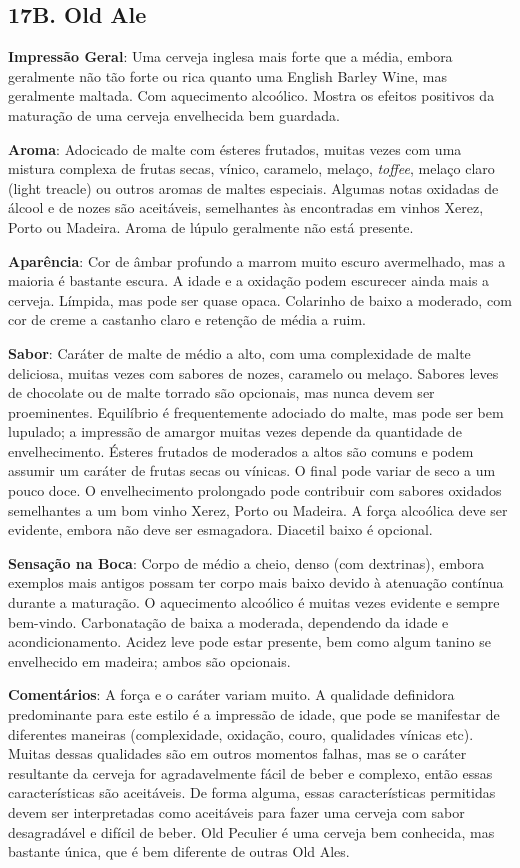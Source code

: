 \subsection*{17B. Old Ale}
\textbf{Impressão Geral}: Uma cerveja inglesa mais forte que a média, embora geralmente não tão forte ou rica quanto uma English Barley Wine, mas geralmente maltada. Com aquecimento alcoólico. Mostra os efeitos positivos da maturação de uma cerveja envelhecida bem guardada.

\textbf{Aroma}: Adocicado de malte com ésteres frutados, muitas vezes com uma mistura complexa de frutas secas, vínico, caramelo, melaço, \textit{toffee}, melaço claro (light treacle) ou outros aromas de maltes especiais. Algumas notas oxidadas de álcool e de nozes são aceitáveis, semelhantes às encontradas em vinhos Xerez, Porto ou Madeira. Aroma de lúpulo geralmente não está presente.

\textbf{Aparência}: Cor de âmbar profundo a marrom muito escuro avermelhado, mas a maioria é bastante escura. A idade e a oxidação podem escurecer ainda mais a cerveja. Límpida, mas pode ser quase opaca. Colarinho de baixo a moderado, com cor de creme a castanho claro e retenção de média a ruim.

\textbf{Sabor}: Caráter de malte de médio a alto, com uma complexidade de malte deliciosa, muitas vezes com sabores de nozes, caramelo ou melaço. Sabores leves de chocolate ou de malte torrado são opcionais, mas nunca devem ser proeminentes. Equilíbrio é frequentemente adociado do malte, mas pode ser bem lupulado; a impressão de amargor muitas vezes depende da quantidade de envelhecimento. Ésteres frutados de moderados a altos são comuns e podem assumir um caráter de frutas secas ou vínicas. O final pode variar de seco a um pouco doce. O envelhecimento prolongado pode contribuir com sabores oxidados semelhantes a um bom vinho Xerez, Porto ou Madeira. A força alcoólica deve ser evidente, embora não deve ser esmagadora. Diacetil baixo é opcional.

\textbf{Sensação na Boca}: Corpo de médio a cheio, denso (com dextrinas), embora exemplos mais antigos possam ter corpo mais baixo devido à atenuação contínua durante a maturação. O aquecimento alcoólico é muitas vezes evidente e sempre bem-vindo. Carbonatação de baixa a moderada, dependendo da idade e acondicionamento. Acidez leve pode estar presente, bem como algum tanino se envelhecido em madeira; ambos são opcionais.

\textbf{Comentários}: A força e o caráter variam muito. A qualidade definidora predominante para este estilo é a impressão de idade, que pode se manifestar de diferentes maneiras (complexidade, oxidação, couro, qualidades vínicas etc). Muitas dessas qualidades são em outros momentos falhas, mas se o caráter resultante da cerveja for agradavelmente fácil de beber e complexo, então essas características são aceitáveis. De forma alguma, essas características permitidas devem ser interpretadas como aceitáveis para fazer uma cerveja com sabor desagradável e difícil de beber. Old Peculier é uma cerveja bem conhecida, mas bastante única, que é bem diferente de outras Old Ales.

